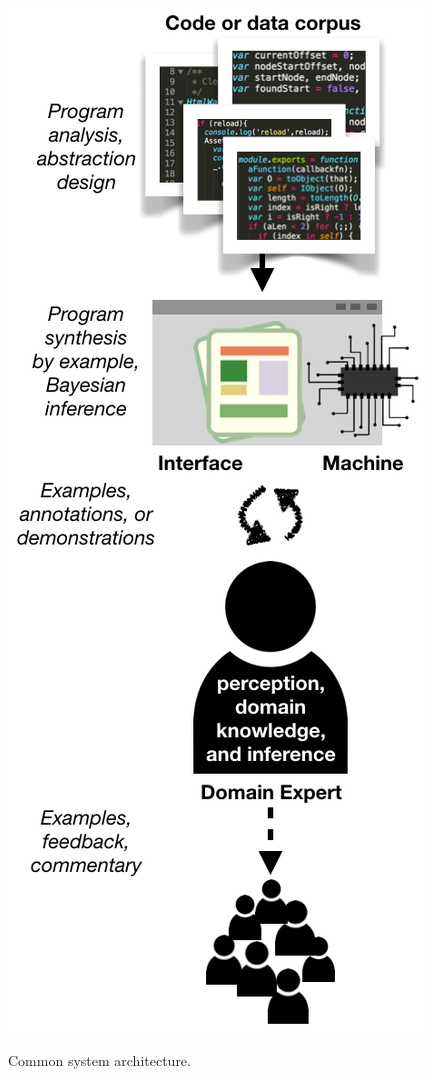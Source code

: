 \documentclass[justified]{tufte-handout}
\begin{document}
\begin{marginfigure}
  \includegraphics[width=0.75\linewidth]{Summary_figure2.png}
  \caption{Common system architecture.}
  \label{fig:summaryfig2}
\end{marginfigure}

\end{document}

